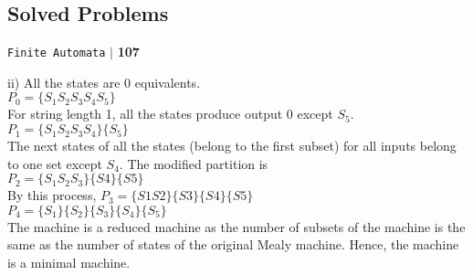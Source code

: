 \documentclass[8pt]{beamer}
\begin{document}
\begin{frame}
 \section*{Solved Problems}
\begin{flushright}
 \texttt{Finite Automata} \hspace*{0.1cm}\textbf{$|$} \hspace*{0.1cm} \textbf{107}\hspace*{0.1cm}
\end{flushright}
\vspace*{0.5cm}

ii) All the states are 0 equivalents.\\

\hspace*{4cm} $P_0 = \{S_1S_2S_3S_4S_5\}$ \\

\hspace*{0.5cm} For string length 1, all the states produce output 0 except $S_5$.\\

\hspace*{4cm} $P_1 = \{S_1S_2S_3S_4\}\{S_5\}$ \\

\hspace*{0.5cm} The next states of all the states (belong to the first subset) for all inputs belong to one set
except $S_4$. The modified partition is\\

\hspace*{4cm} $P_2 = \{S_1S_2S_3\}\{S4\}\{S5\}$ \\

\hspace*{0.5cm} By this process, $P_3 = \{S1S2\}\{S3\}\{S4\}\{S5\}$ \\

\hspace*{4cm} $P_4 = \{S_1\}\{S_2\}\{S_3\}\{S_4\}\{S_5\}$ \\

\hspace*{0.5cm} The machine is a reduced machine as the number of subsets of the machine is the same
as the number of states of the original Mealy machine. Hence, the machine is a minimal
machine.\\

\vspace*{0.4cm}
\end{frame}
\end{document}
